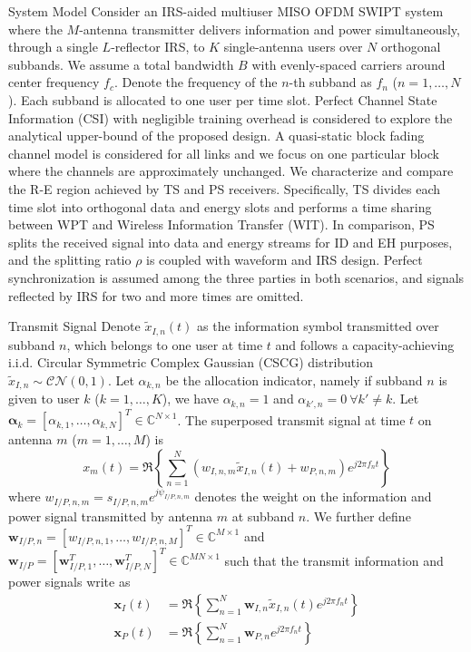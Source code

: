 \documentclass{IEEEtran}
\begin{document}
\begin{section}{System Model}
	Consider an IRS-aided multiuser MISO OFDM SWIPT system where the $M$-antenna transmitter delivers information and power simultaneously, through a single $L$-reflector IRS, to $K$ single-antenna users over $N$ orthogonal subbands. We assume a total bandwidth $B$ with evenly-spaced carriers around center frequency $f_c$. Denote the frequency of the $n$-th subband as $f_n$ ($n=1,\dots,N$). Each subband is allocated to one user per time slot. Perfect Channel State Information (CSI) with negligible training overhead is considered to explore the analytical upper-bound of the proposed design. A quasi-static block fading channel model is considered for all links and we focus on one particular block where the channels are approximately unchanged. We characterize and compare the R-E region achieved by TS and PS receivers. Specifically, TS divides each time slot into orthogonal data and energy slots and performs a time sharing between WPT and Wireless Information Transfer (WIT). In comparison, PS splits the received signal into data and energy streams for ID and EH purposes, and the splitting ratio $\rho$ is coupled with waveform and IRS design. Perfect synchronization is assumed among the three parties in both scenarios, and signals reflected by IRS for two and more times are omitted.
	\begin{subsection}{Transmit Signal}
		Denote $\tilde{x}_{I,n}(t)$ as the information symbol transmitted over subband $n$, which belongs to one user at time $t$ and follows a capacity-achieving i.i.d. Circular Symmetric Complex Gaussian (CSCG) distribution $\tilde{x}_{I,n}\sim\mathcal{CN}(0,1)$. Let $\alpha_{k,n}$ be the allocation indicator, namely if subband $n$ is given to user $k$ ($k=1,\dots,K$), we have $\alpha_{k,n}=1$ and $\alpha_{k',n}=0 \ \forall k' \ne k$. Let $\boldsymbol{\alpha}_k=[\alpha_{k,1},\dots,\alpha_{k,N}]^T \in \mathbb{C}^{N \times 1}$. The superposed transmit signal at time $t$ on antenna $m$ ($m=1,\dots,M$) is
		\begin{equation}\label{eq:x_m}
			x_m(t)=\Re\left\{\sum_{n=1}^N\left({w_{I,n,m}\tilde{x}_{I,n}(t)}+w_{P,n,m}\right){e^{j2{\pi}{f_n}{t}}}\right\}
		\end{equation}
		where $w_{I/P,n,m}=s_{I/P,n,m}e^{j\psi_{I/P,n,m}}$ denotes the weight on the information and power signal transmitted by antenna $m$ at subband $n$. We further define $\boldsymbol{w}_{I/P,n}=[w_{I/P,n,1},\dots,w_{I/P,n,M}]^T \in \mathbb{C}^{M \times 1}$ and $\boldsymbol{w}_{I/P}=[\boldsymbol{w}_{I/P,1}^T,\dots,\boldsymbol{w}_{I/P,N}^T]^T \in \mathbb{C}^{MN \times 1}$ such that the transmit information and power signals write as
		\begin{align}
			\boldsymbol{x}_{I}(t) &= \Re{\left\{\sum_{n=1}^N\boldsymbol{w}_{I,n}\tilde{x}_{I,n}(t){e^{j2{\pi}{f_n}{t}}}\right\}}\label{eq:x_I}\\
			\boldsymbol{x}_{P}(t) &= \Re{\left\{\sum_{n=1}^N\boldsymbol{w}_{P,n}{e^{j2{\pi}{f_n}{t}}}\right\}}\label{eq:x_P}
		\end{align}
	\end{subsection}


\end{section}
\end{document}
